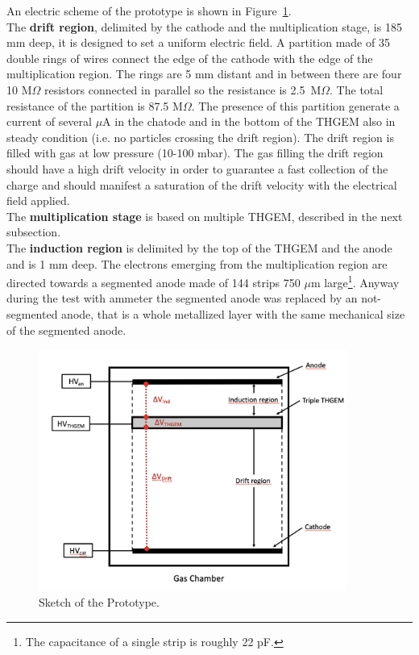 \documentclass[a4paper, 11 pt]{report}
\begin{document}
An electric scheme of the prototype is shown in Figure~\ref{fig:schema_apparato_2}.\\ 
The {\bf drift region}, delimited by the cathode and the multiplication stage, is 185 mm deep, it is
designed to set a uniform electric field. A partition made of 35 double rings of wires connect 
the edge of the cathode with the edge of the multiplication region. The rings are 5 mm distant and 
in between there are four 10 M$\Omega$ resistors connected in parallel so the resistance is 
2.5~M$\Omega$. The total resistance of the partition is 87.5 M$\Omega$. The presence of this 
partition generate a current of several $\mu$A in the chatode and in the bottom of the THGEM also 
in steady condition (i.e. no particles crossing the drift region). The drift region is filled with 
gas at low pressure (10-100 mbar). The gas filling the drift region should have a high drift 
velocity in order to guarantee a fast collection of the charge and should manifest a saturation of 
the drift velocity with the electrical field applied.\\
The {\bf multiplication stage} is based on multiple THGEM, described in the next subsection.\\
The {\bf induction region} is delimited by the top of the THGEM and the anode and is 1 mm deep. 
The electrons emerging from the multiplication region are directed towards a segmented anode made 
of 144 strips 750 $\mu$m large\footnote{The capacitance of a single strip is roughly 22 pF.}. 
Anyway during the test with ammeter the segmented anode was replaced by an not-segmented anode, 
that is a whole metallized layer with the same mechanical size of the segmented anode.
\begin{figure}
	\centering
	\includegraphics[width=0.9\textwidth]{Immagini/schema_apparato_2.png}
	\caption{Sketch of the Prototype.}
	\label{fig:schema_apparato_2}
\end{figure}
\end{document}
